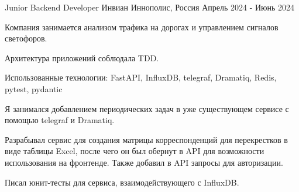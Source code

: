 

\begin{cventries}

  \cventry
    {Junior Backend Developer} %
    {Инвиан} %
    {Иннополис, Россия} %
    {Апрель 2024 - Июнь 2024} %
    {
      \begin{cvitems} %
        \item {Компания занимается анализом трафика на дорогах и управлением сигналов светофоров. }
        \item {Архитектура приложений соблюдала TDD. }
        \item {Использованные технологии: FastAPI, InfluxDB, telegraf, Dramatiq, Redis, pytest, pydantic }
        \item {Я занимался добавлением периодических задач в уже существующем сервисе с помощью telegraf и Dramatiq. }
        \item {Разрабывал сервис для создания матрицы корреспонденций для перекрестков в виде таблицы Excel, после чего он был обернут в API для возможности использования на фронтенде. Также добавил в API запросы для авторизации. }
        \item {Писал юнит-тесты для сервиса, взаимодействующего с InfluxDB. }
      \end{cvitems}
    }
\end{cventries}
